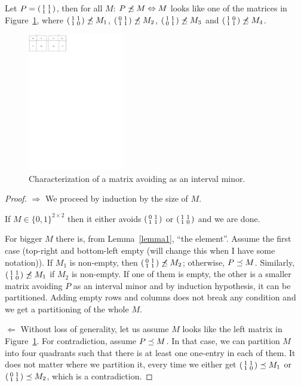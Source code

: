\begin{thm}
Let $P=\left(\begin{smallmatrix}1&1\\1&1\end{smallmatrix}\right)$, then for all $M$: $P\not\preceq M\Leftrightarrow M$ looks like one of the matrices in Figure~\ref{p33}, where $\left(\begin{smallmatrix}1&1\\1&0\end{smallmatrix}\right)\not\preceq M_1$, $\left(\begin{smallmatrix}0&1\\1&1\end{smallmatrix}\right)\not\preceq M_2$, $\left(\begin{smallmatrix}1&1\\0&1\end{smallmatrix}\right)\not\preceq M_3$ and $\left(\begin{smallmatrix}1&0\\1&1\end{smallmatrix}\right)\not\preceq M_4$.
\end{thm}
\begin{figure}[h!]
\centering
\includegraphics[height=60mm]{img/p33.pdf}
\caption{Characterization of a matrix avoiding \usebox{\smlmatb} as an interval minor.}
\label{p33}
\end{figure}
\begin{proof}
\item[$\Rightarrow$] We proceed by induction by the size of $M$.

If $M\in\{0,1\}^{2\times2}$ then it either avoids $\left(\begin{smallmatrix}0&1\\1&1\end{smallmatrix}\right)$ or $\left(\begin{smallmatrix}1&1\\1&0\end{smallmatrix}\right)$ and we are done.

For bigger $M$ there is, from Lemma~\ref{lemma1}, ``the element''. Assume the first case (top-right and bottom-left empty (will change this when I have some notation)). If $M_1$ is non-empty, then $\left(\begin{smallmatrix}0&1\\1&1\end{smallmatrix}\right)\not\preceq M_2$; otherwise, $P\preceq M$. Similarly, $\left(\begin{smallmatrix}1&1\\1&0\end{smallmatrix}\right)\not\preceq M_1$ if $M_2$ is non-empty. If one of them is empty, the other is a smaller matrix avoiding $P$ as an interval minor and by induction hypothesis, it can be partitioned. Adding empty rows and columns does not break any condition and we get a partitioning of the whole $M$.
\item[$\Leftarrow$] Without loss of generality, let us assume $M$ looks like the left matrix in Figure~\ref{p33}. For contradiction, assume $P\preceq M$. In that case, we can partition $M$ into four quadrants such that there is at least one one-entry in each of them. It does not matter where we partition it, every time we either get $\left(\begin{smallmatrix}1&1\\1&0\end{smallmatrix}\right)\preceq M_1$ or $\left(\begin{smallmatrix}0&1\\1&1\end{smallmatrix}\right)\preceq M_2$, which is a contradiction.
\end{proof}


